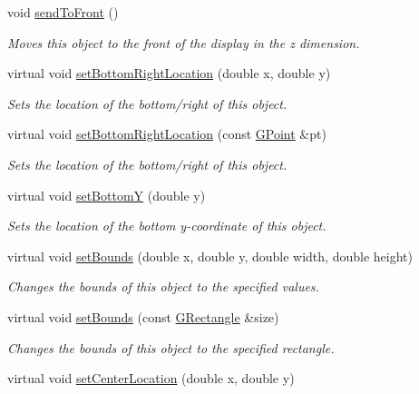 \begin{DoxyCompactItemize}
void \mbox{\hyperlink{classsgl_1_1GObject_aee33d68488e46827ef55fac07f40a9b2}{send\+To\+Front}} ()
\begin{DoxyCompactList}\small\item\em Moves this object to the front of the display in the {\itshape z} dimension. \end{DoxyCompactList}\item 
virtual void \mbox{\hyperlink{classsgl_1_1GObject_a71ff7b16b8f1bdc4a1ce9f30cf8b87d8}{set\+Bottom\+Right\+Location}} (double x, double y)
\begin{DoxyCompactList}\small\item\em Sets the location of the bottom/right of this object. \end{DoxyCompactList}\item 
virtual void \mbox{\hyperlink{classsgl_1_1GObject_ac6f7320321182f1d18c1c0fa97d5e941}{set\+Bottom\+Right\+Location}} (const \mbox{\hyperlink{structsgl_1_1GPoint}{G\+Point}} \&pt)
\begin{DoxyCompactList}\small\item\em Sets the location of the bottom/right of this object. \end{DoxyCompactList}\item 
virtual void \mbox{\hyperlink{classsgl_1_1GObject_a4b20e93c2a2597484f74ee5caa71f41f}{set\+BottomY}} (double y)
\begin{DoxyCompactList}\small\item\em Sets the location of the bottom y-\/coordinate of this object. \end{DoxyCompactList}\item 
virtual void \mbox{\hyperlink{classsgl_1_1GObject_a2aae8197624b72265ab83b4f1bc73f2f}{set\+Bounds}} (double x, double y, double width, double height)
\begin{DoxyCompactList}\small\item\em Changes the bounds of this object to the specified values. \end{DoxyCompactList}\item 
virtual void \mbox{\hyperlink{classsgl_1_1GObject_acada386653f008cacc7cce86426bef7c}{set\+Bounds}} (const \mbox{\hyperlink{structsgl_1_1GRectangle}{G\+Rectangle}} \&size)
\begin{DoxyCompactList}\small\item\em Changes the bounds of this object to the specified rectangle. \end{DoxyCompactList}\item 
virtual void \mbox{\hyperlink{classsgl_1_1GObject_a290b47dd8de1be44089f95cb2c47c1de}{set\+Center\+Location}} (double x, double y)

\end{DoxyCompactItemize}
